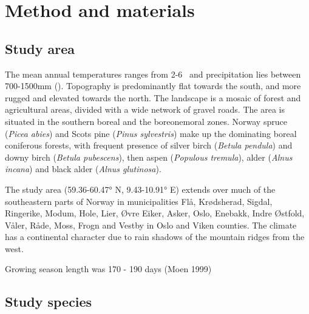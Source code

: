 \chapter{Method and materials}


\section{Study area} %


The mean annual temperatures ranges from 2-6 \celsius \ and precipitation lies between 700-1500mm (\cite{Moen1999}). 
Topography is predominantly flat towards the south, and more rugged and elevated towards the north. The landscape is a mosaic of forest and agricultural areas, divided with a wide network of gravel roads.
The area is situated in the southern boreal and the boreonemoral zones. %
Norway spruce (\textit{Picea abies}) and Scots pine (\textit{Pinus sylvestris}) make up the dominating boreal coniferous forests, with frequent presence of silver birch (\textit{Betula pendula}) and downy birch (\textit{Betula pubescens}), then aspen (\textit{Populous tremula}), alder (\textit{Alnus incana}) and black alder (\textit{Alnus glutinosa}).


The study area (59.36-60.47° N, 9.43-10.91° E) %
extends over much of the southeastern parts of Norway in municipalities Flå, Krødsherad, Sigdal, Ringerike, Modum, Hole, Lier, Øvre Eiker, Asker, Oslo, Enebakk, Indre Østfold, Våler, Råde, Moss, Frogn and Vestby in Oslo and Viken counties. 
The climate has a continental character due to rain shadows of the mountain ridges from the west. 


Growing season length was 170 - 190 days (Moen 1999) %


\section{Study species} %

